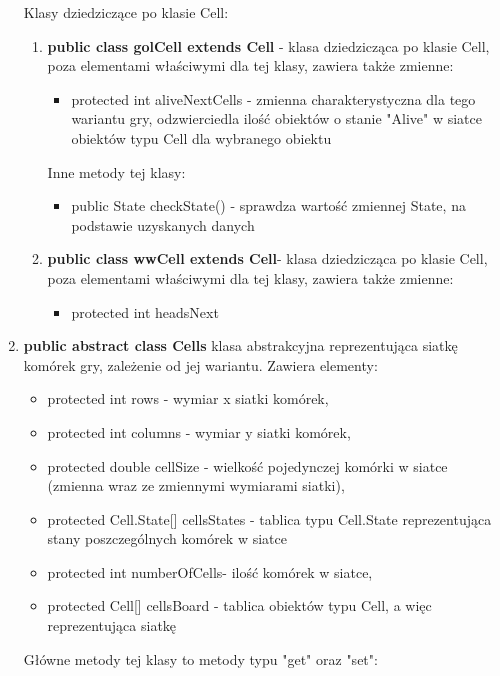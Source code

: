 \documentclass[10pt, oneside]{article}
\begin{document}
\begin{enumerate}
Klasy dziedziczące po klasie Cell:
	\begin {enumerate}
	\item \textbf {public class golCell extends Cell}  - klasa dziedzicząca po klasie Cell, poza elementami właściwymi dla tej klasy, zawiera także zmienne:
		\begin {itemize}
		\item protected int aliveNextCells - zmienna charakterystyczna dla tego wariantu gry, odzwierciedla ilość obiektów o stanie "Alive" w siatce obiektów typu Cell dla wybranego obiektu
		\end {itemize}
		Inne metody tej klasy:
		\begin {itemize}
		\item public State checkState() - sprawdza wartość zmiennej State, na podstawie  uzyskanych danych 
		\end {itemize}
	\item \textbf {public class wwCell extends Cell}- klasa dziedzicząca po klasie Cell, poza elementami właściwymi dla tej klasy, zawiera także zmienne:
		\begin {itemize}
		\item protected int headsNext
		\end {itemize}
\end {enumerate}



\item  \textbf{public abstract class Cells}
	 klasa abstrakcyjna reprezentująca siatkę komórek gry, zależenie od jej wariantu. Zawiera elementy:
	\begin {itemize}
	\item    protected int rows - wymiar x siatki komórek,
	\item protected int  columns - wymiar y siatki komórek,
   	\item  protected double cellSize - wielkość pojedynczej komórki w siatce (zmienna wraz ze zmiennymi wymiarami siatki),
   	\item  protected Cell.State[] cellsStates - tablica typu Cell.State reprezentująca stany poszczególnych komórek w siatce
   	\item protected int numberOfCells- ilość komórek w siatce,
	\item protected Cell[] cellsBoard - tablica obiektów typu Cell, a więc  reprezentująca siatkę
	\end{itemize}



Główne metody tej klasy to metody typu "get" oraz "set":


\end{enumerate}
\end{document}
